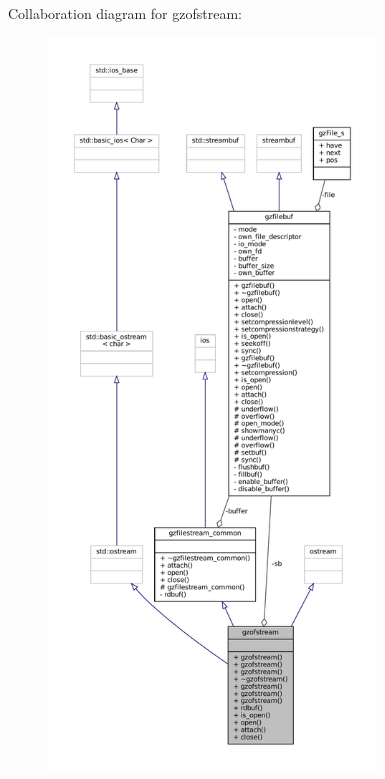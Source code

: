 Collaboration diagram for gzofstream\+:
\nopagebreak
\begin{figure}[H]
\begin{center}
\leavevmode
\includegraphics[height=550pt]{classgzofstream__coll__graph}
\end{center}
\end{figure}
